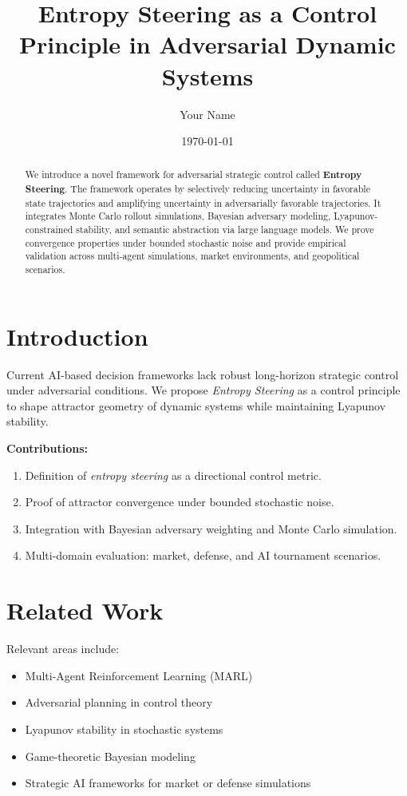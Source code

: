 \documentclass[12pt]{article}
\title{Entropy Steering as a Control Principle in Adversarial Dynamic Systems}
\author{Your Name}
\date{\today}
\begin{document}
\maketitle

\begin{abstract}
We introduce a novel framework for adversarial strategic control called \textbf{Entropy Steering}. The framework operates by selectively reducing uncertainty in favorable state trajectories and amplifying uncertainty in adversarially favorable trajectories. It integrates Monte Carlo rollout simulations, Bayesian adversary modeling, Lyapunov-constrained stability, and semantic abstraction via large language models. We prove convergence properties under bounded stochastic noise and provide empirical validation across multi-agent simulations, market environments, and geopolitical scenarios.
\end{abstract}

\tableofcontents
\newpage

\section{Introduction}
Current AI-based decision frameworks lack robust long-horizon strategic control under adversarial conditions.
We propose \textit{Entropy Steering} as a control principle to shape attractor geometry of dynamic systems while maintaining Lyapunov stability.

\textbf{Contributions:}
\begin{enumerate}
    \item Definition of \textit{entropy steering} as a directional control metric.
    \item Proof of attractor convergence under bounded stochastic noise.
    \item Integration with Bayesian adversary weighting and Monte Carlo simulation.
    \item Multi-domain evaluation: market, defense, and AI tournament scenarios.
\end{enumerate}

\section{Related Work}
Relevant areas include:
\begin{itemize}
    \item Multi-Agent Reinforcement Learning (MARL)
    \item Adversarial planning in control theory
    \item Lyapunov stability in stochastic systems
    \item Game-theoretic Bayesian modeling
    \item Strategic AI frameworks for market or defense simulations
\end{itemize}
\end{document}
